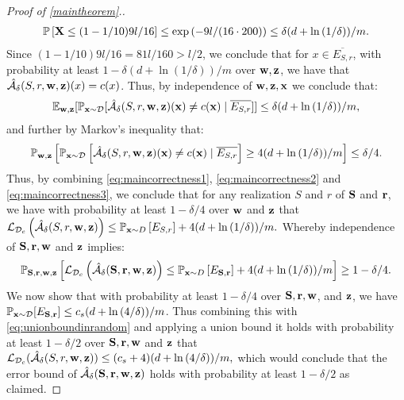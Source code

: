 \begin{proof}[Proof of \cref{maintheorem}.]
\begin{align*}
 \mathbb{P}\left[\mathbf{X}\leq (1-1/10)9l/16\right]
\leq  \exp{\left(-9l/(16\cdot 200) \right)} \leq \delta (d+\ln{\left(1/\delta \right)})/m.
\end{align*} 
Since $(1-1/10)9l/16=81l/160>l/2$, we conclude that for $x\in \overline{E_{S,r}}$, with probability at least $1- \delta (d+\ln{\left(1/\delta \right)})/m$ over $ \mathbf{w},\mathbf{z} $, we have that $\mathcal{\hat{A}}_{\delta}(S,r,\mathbf{w},\mathbf{z})(x)=c(x)$. Thus, by independence of $\mathbf{w},\mathbf{z},\mathbf{x}$ we conclude that: 
\begin{align*}
 \mathbb{E}_{\mathbf{w},\mathbf{z}}[\mathbb{P}_{\mathbf{x}\sim\mathcal{D}}[\mathcal{\hat{A}}_{\delta}(S,r,\mathbf{w},\mathbf{z})(\mathbf{x})\not=c(\mathbf{x})\mid \overline{E_{S,r}}]]
\leq \delta (d+\ln{\left(1/\delta \right)} )/m,
\end{align*}
and further by Markov's inequality that:
\begin{align}\label{eq:maincorrectness3}
  \mathbb{P}_{\mathbf{w},\mathbf{z}}\left[\mathbb{P}_{\mathbf{x}\sim\mathcal{D}}\left[\mathcal{\hat{A}}_{\delta}(S,r,\mathbf{w},\mathbf{z})(\mathbf{x})\not=c(\mathbf{x})\mid \overline{E_{S,r}}\right]\geq 4(d+\ln{\left(1/\delta \right)})/m\right]\leq \delta /4.
\end{align}
Thus, by combining \cref{eq:maincorrectness1}, \cref{eq:maincorrectness2} and \cref{eq:maincorrectness3}, we conclude that for any realization $S$ and $r$ of $\mathbf{S}$ and $\mathbf{r}$, we have with probability at least $1-\delta/4$ over $\mathbf{w}$ and $\mathbf{z}$ that
$\operatorname{\mathcal{L}}_{\mathcal{D}_{c}}\left(\mathcal{\hat{A}}_{\delta}(S,r,\mathbf{w},\mathbf{z})\right)\leq \mathbb{P}_{\mathbf{x}\sim D}\left[E_{S,r}\right]+4(d+\ln{(1/\delta)})/m.$
Whereby independence of $\mathbf{S},\mathbf{r},\mathbf{w}$ and $\mathbf{z}$ implies:
\begin{align}\label{eq:unionboundinrandom}
  \mathbb{P}_{\mathbf{S},\mathbf{r},\mathbf{w},\mathbf{z}}\left[ \operatorname{\mathcal{L}}_{\mathcal{D}_{c}}\left(\mathcal{\hat{A}}_{\delta}(\mathbf{S},\mathbf{r},\mathbf{w},\mathbf{z})\right) \leq \mathbb{P}_{\mathbf{x}\sim D}\left[E_{\mathbf{S},\mathbf{r}}\right]+4(d+\ln{\left(1/\delta \right)})/m\right]
  \geq 1-\delta/4.
\end{align}
We now show that with probability at least $1-\delta/4$ over $\mathbf{S},\mathbf{r},\mathbf{w}$, and $\mathbf{z}$, we have $\mathbb{P}_{\mathbf{x}\sim\mathcal{D}}[E_{\mathbf{S},\mathbf{r}}]\leq c_s(d+\ln{\left(4/\delta \right)})/m$. Thus combining this with \cref{eq:unionboundinrandom} and applying a union bound it holds with probability at least $1-\delta/2$ over $\mathbf{S},\mathbf{r},\mathbf{w}$ and $\mathbf{z}$ that $
  \operatorname{\mathcal{L}}_{\mathcal{D}_{c}}(\mathcal{\hat{A}}_{\delta}(S,r,\mathbf{w},\mathbf{z}))\leq(c_s+4) (d+\ln{\left(4/\delta \right)})/m,$
which would conclude that the error bound of $ \mathcal{\hat{A}}_{\delta}(\mathbf{S},\mathbf{r},\mathbf{w},\mathbf{z}) $  holds with probability at least $1-\delta/2$ as claimed. 


\end{proof}
